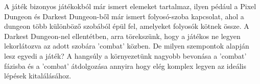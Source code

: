 

A játék bizonyos játékokból már ismert elemeket tartalmaz, ilyen pédául a Pixel Dungeon és Darkest Dungeon-ből már ismert folyosó-szoba kapcsolat, ahol a dungeon több különböző szobából épül fel, amelyeket folyosók kötnek össze. A Darkest Dungeon-nel ellentétben, arra törekszünk, hogy a játékos ne legyen lekorlátozva az adott szobára 'combat' közben.
De milyen szempontok alapján lesz egyedi a játék? A hangsúly a környezetünk nagyobb bevonása a 'combat' fázisba és a 'combat' átdolgozása annyira hogy elég komplex legyen az ideális lépések kitalálásához.
\newpage
{}

